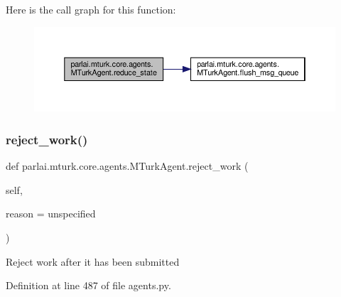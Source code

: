 Here is the call graph for this function\+:
\nopagebreak
\begin{figure}[H]
\begin{center}
\leavevmode
\includegraphics[width=350pt]{classparlai_1_1mturk_1_1core_1_1agents_1_1MTurkAgent_aa5dd2f607442909921b3108b416460b3_cgraph}
\end{center}
\end{figure}
\mbox{\label{classparlai_1_1mturk_1_1core_1_1agents_1_1MTurkAgent_a88473ff128e7a40c59711d35eab97a0b}} 
\subsubsection{\texorpdfstring{reject\+\_\+work()}{reject\_work()}}
{\footnotesize\ttfamily def parlai.\+mturk.\+core.\+agents.\+M\+Turk\+Agent.\+reject\+\_\+work (\begin{DoxyParamCaption}\item[{}]{self,  }\item[{}]{reason = {\ttfamily \textquotesingle{}unspecified\textquotesingle{}} }\end{DoxyParamCaption})}

\begin{DoxyVerb}Reject work after it has been submitted\end{DoxyVerb}
 

Definition at line 487 of file agents.\+py.



